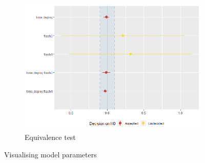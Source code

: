 \begin{figure}
\begin{subfigure}{.8\textwidth}
	\includegraphics[scale=1]{../R/glmm_sp_files/figure-gfm/parameters-3.png}
\caption{Equivalence test}
		\label{fig:para_raa3}
	\end{subfigure}
		\caption{Visualising model parameters}
	\label{fig:para_sp}
\end{figure}

